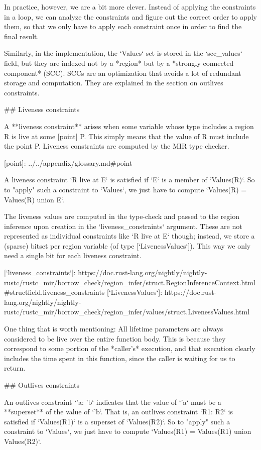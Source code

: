 \documentclass[12pt, a4paper]{article}
\begin{document}
In practice, however, we are a bit more clever. Instead of applying
the constraints in a loop, we can analyze the constraints and figure
out the correct order to apply them, so that we only have to apply
each constraint once in order to find the final result.

Similarly, in the implementation, the `Values` set is stored in the
`scc_values` field, but they are indexed not by a *region* but by a
*strongly connected component* (SCC). SCCs are an optimization that
avoids a lot of redundant storage and computation.  They are explained
in the section on outlives constraints.

## Liveness constraints

A **liveness constraint** arises when some variable whose type
includes a region R is live at some [point] P. This simply means that
the value of R must include the point P. Liveness constraints are
computed by the MIR type checker.

[point]: ../../appendix/glossary.md#point

A liveness constraint `R live at E` is satisfied if `E` is a member of
`Values(R)`. So to "apply" such a constraint to `Values`, we just have
to compute `Values(R) = Values(R) union {E}`.

The liveness values are computed in the type-check and passed to the
region inference upon creation in the `liveness_constraints` argument.
These are not represented as individual constraints like `R live at E`
though; instead, we store a (sparse) bitset per region variable (of
type [`LivenessValues`]). This way we only need a single bit for each
liveness constraint.

[`liveness_constraints`]: https://doc.rust-lang.org/nightly/nightly-rustc/rustc_mir/borrow_check/region_infer/struct.RegionInferenceContext.html#structfield.liveness_constraints
[`LivenessValues`]: https://doc.rust-lang.org/nightly/nightly-rustc/rustc_mir/borrow_check/region_infer/values/struct.LivenessValues.html

One thing that is worth mentioning: All lifetime parameters are always
considered to be live over the entire function body. This is because
they correspond to some portion of the *caller's* execution, and that
execution clearly includes the time spent in this function, since the
caller is waiting for us to return.

## Outlives constraints

An outlives constraint `'a: 'b` indicates that the value of `'a` must
be a **superset** of the value of `'b`. That is, an outlives
constraint `R1: R2` is satisfied if `Values(R1)` is a superset of
`Values(R2)`. So to "apply" such a constraint to `Values`, we just
have to compute `Values(R1) = Values(R1) union Values(R2)`.
\end{document}
